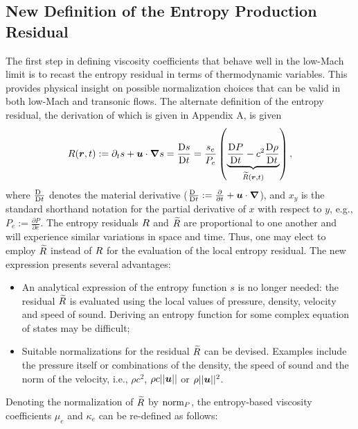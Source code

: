 \subsection{New Definition of the Entropy Production Residual}\label{sec:new_ent_prod} 

The first step in defining viscosity coefficients that behave well in the low-Mach limit is to recast the entropy residual in terms of thermodynamic variables. This provides physical insight on possible normalization choices that can be valid in both low-Mach and transonic flows. The alternate definition of the entropy residual, the derivation of which is given in Appendix A, is given %
%
\begin{equation}
\label{eq:ent_res}
R(\boldsymbol r,t) := \partial_t s + \boldsymbol u \cdot \boldsymbol{\nabla} s = \frac{\textrm{D} s}{\textrm{D} t} = \frac{s_e}{P_e} \left( \underbrace{\frac{\textrm{D} P}{\textrm{D} t} - c^2 \frac{\textrm{D} \rho}{\textrm{D} t} }_{\widetilde{R}(\boldsymbol r,t)} \right) ,
\end{equation} 
%
where $\frac{\textrm{D} \ }{\textrm{D} t}$ denotes the material derivative ($\frac{\textrm{D} \ }{\textrm{D} t}:= \frac{\partial}{\partial t} + \boldsymbol u \cdot \boldsymbol{\nabla}$), and $x_y$ is the standard shorthand notation for the partial derivative of $x$ with respect to $y$, e.g., $P_e:=\frac{\partial P}{\partial e}$. 
%
The entropy residuals $R$ and $\widetilde{R}$ are proportional to one another and will experience similar variations in space and time. Thus, one may elect to employ $\widetilde{R}$ instead of $R$ for the evaluation of the local entropy residual. The new expression presents several advantages:
%
\begin{itemize}
\item An analytical expression of the entropy function $s$ is no longer needed: the residual $\widetilde{R}$ is evaluated using the local values of pressure, density, velocity and speed of sound. Deriving an entropy function for some complex equation of states may be difficult;
\item Suitable normalizations for the residual $\widetilde{R}$ can be devised. Examples include the pressure itself or combinations of the density, the speed of sound and the norm of the velocity, i.e., $\rho c^2$, $\rho c || \boldsymbol u ||$ or $\rho || \boldsymbol u ||^2$. 
\end{itemize}
%
Denoting the normalization of $\widetilde{R}$ by $\textrm{norm}_P$, the entropy-based viscosity coefficients $\mu_e$ and $\kappa_e$ can be re-defined as follows:
